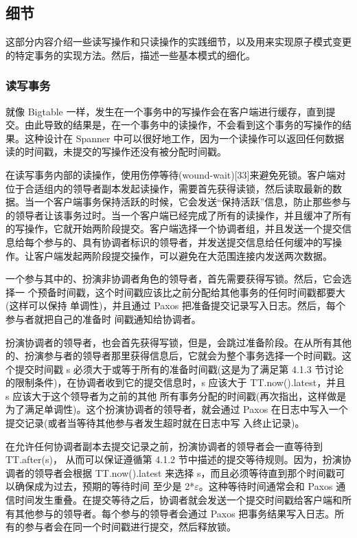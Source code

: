 \documentclass[letterpaper,twocolumn,10pt]{article}
\begin{document}
\subsection{细节}
这部分内容介绍一些读写操作和只读操作的实践细节，以及用来实现原子模式变更的特定事务的实现方法。然后，描述一些基本模式的细化。

\subsubsection{读写事务}
就像 Bigtable 一样，发生在一个事务中的写操作会在客户端进行缓存，直到提交。由此导致的结果是，在一个事务中的读操作，不会看到这个事务的写操作的结果。这种设计在 Spanner 中可以很好地工作，因为一个读操作可以返回任何数据读的时间戳，未提交的写操作还没有被分配时间戳。

在读写事务内部的读操作，使用伤停等待(wound-wait)[33]来避免死锁。客户端对位于合适组内的领导者副本发起读操作，需要首先获得读锁，然后读取最新的数据。当一个客户端事务保持活跃的时候，它会发送“保持活跃”信息，防止那些参与的领导者让该事务过时。当一个客户端已经完成了所有的读操作，并且缓冲了所有的写操作，它就开始两阶段提交。客户端选择一个协调者组，并且发送一个提交信息给每个参与的、具有协调者标识的领导者，并发送提交信息给任何缓冲的写操作。让客户端发起两阶段提交操作，可以避免在大范围连接内发送两次数据。

一个参与其中的、扮演非协调者角色的领导者，首先需要获得写锁。然后，它会选择一 个预备时间戳，这个时间戳应该比之前分配给其他事务的任何时间戳都要大(这样可以保持 单调性)，并且通过 Paxos 把准备提交记录写入日志。然后，每个参与者就把自己的准备时 间戳通知给协调者。

扮演协调者的领导者，也会首先获得写锁，但是，会跳过准备阶段。在从所有其他的、扮演参与者的领导者那里获得信息后，它就会为整个事务选择一个时间戳。这个提交时间戳 s 必须大于或等于所有的准备时间戳(这是为了满足第 4.1.3 节讨论的限制条件)，在协调者收到它的提交信息时，s 应该大于 TT.now().latest，并且 s 应该大于这个领导者为之前的其他 所有事务分配的时间戳(再次指出，这样做是为了满足单调性)。这个扮演协调者的领导者，就会通过 Paxos 在日志中写入一个提交记录(或者当等待其他参与者发生超时就在日志中写 入终止记录)。

在允许任何协调者副本去提交记录之前，扮演协调者的领导者会一直等待到 TT.after(s)， 从而可以保证遵循第 4.1.2 节中描述的提交等待规则。因为，扮演协调者的领导者会根据 TT.now().latest 来选择 s，而且必须等待直到那个时间戳可以确保成为过去，预期的等待时间 至少是 2*$\varepsilon$。这种等待时间通常会和 Paxos 通信时间发生重叠。在提交等待之后，协调者就会发送一个提交时间戳给客户端和所有其他参与的领导者。每个参与的领导者会通过 Paxos 把事务结果写入日志。所有的参与者会在同一个时间戳进行提交，然后释放锁。
\end{document}
